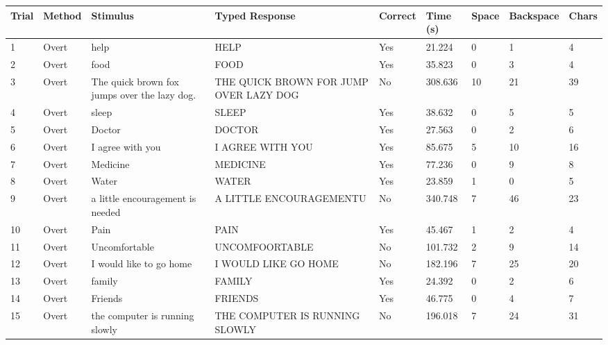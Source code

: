 \documentclass[10pt,a4paper]{article}
\begin{document}
\begin{center}
\begin{tabularx}{\textwidth}{
    C{0.45in}
    C{0.65in}
    L{2.35in}
    L{2.55in}
    C{0.65in}
    C{0.65in}
    C{0.55in}
    C{0.75in}
    C{0.55in}
}
\toprule

\textbf{Trial} &
\textbf{Method} &
\textbf{Stimulus} &
\textbf{Typed Response} &
\textbf{Correct} &
\textbf{Time (s)} &
\textbf{Space} &
\textbf{Backspace} &
\textbf{Chars}
\\

\midrule

1 &
Overt &
help &
HELP &
Yes &
21.224 &
0 &
1 &
4
\\

2 &
Overt &
food &
FOOD &
Yes &
35.823 &
0 &
3 &
4
\\

3 &
Overt &
The quick brown fox jumps over the lazy dog. &
THE QUICK BROWN FOR JUMP OVER  LAZY DOG &
No &
308.636 &
10 &
21 &
39
\\

4 &
Overt &
sleep &
SLEEP &
Yes &
38.632 &
0 &
5 &
5
\\

5 &
Overt &
Doctor &
DOCTOR &
Yes &
27.563 &
0 &
2 &
6
\\

6 &
Overt &
I agree with you &
I AGREE WITH YOU &
Yes &
85.675 &
5 &
10 &
16
\\

7 &
Overt &
Medicine &
MEDICINE &
Yes &
77.236 &
0 &
9 &
8
\\

8 &
Overt &
Water &
WATER &
Yes &
23.859 &
1 &
0 &
5
\\

9 &
Overt &
a little encouragement is needed &
A LITTLE ENCOURAGEMENTU &
No &
340.748 &
7 &
46 &
23
\\

10 &
Overt &
Pain &
PAIN &
Yes &
45.467 &
1 &
2 &
4
\\

11 &
Overt &
Uncomfortable &
UNCOMFOORTABLE &
No &
101.732 &
2 &
9 &
14
\\

12 &
Overt &
I would like to go home &
I WOULD LIKE GO HOME &
No &
182.196 &
7 &
25 &
20
\\

13 &
Overt &
family &
FAMILY &
Yes &
24.392 &
0 &
2 &
6
\\

14 &
Overt &
Friends &
FRIENDS &
Yes &
46.775 &
0 &
4 &
7
\\

15 &
Overt &
the computer is running slowly &
THE  COMPUTER IS RUNNING SLOWLY &
No &
196.018 &
7 &
24 &
31
\\

\bottomrule
\end{tabularx}
\end{center}
\end{document}
